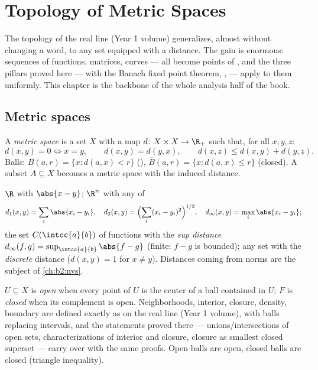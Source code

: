 \chapter{Topology of Metric Spaces}\label{ch:b2:metric}

The topology of the real line (Year 1 volume) generalizes, almost
without changing a word, to any set equipped with a distance. The
gain is enormous: sequences of functions, matrices, curves --- all
become points of , and the three pillars proved here
---  with the Banach fixed point theorem, ,
 --- apply to them uniformly. This chapter is the
backbone of the whole analysis half of the book.

\section{Metric spaces}

\begin{definition}\label{def:b2:metric:def}
A \emph{metric space} is a set $X$ with a map $d
\colon X \times X \to \R_+$ such that, for all $x, y, z$:
\[
d(x,y) = 0 \iff x = y,
\qquad
d(x,y) = d(y,x),
\qquad
d(x,z) \leq d(x,y) + d(y,z).
\]
Balls: $B(a, r) = \{x : d(a,x) < r\}$ (), $\overline B(a,r) =
\{x : d(a,x) \leq r\}$ (closed). A subset $A \subseteq X$ becomes a
metric space with the induced distance.
\end{definition}

\begin{example}\label{ex:b2:metric:examples}
$\R$ with $\abs{x - y}$; $\R^n$ with any of
\[
d_1(x,y) = \sum_i \abs{x_i - y_i},
\quad
d_2(x,y) = \Bigl(\sum_i (x_i - y_i)^2\Bigr)^{1/2},
\quad
d_\infty(x,y) = \max_i \abs{x_i - y_i};
\]
the set $C(\intcc{a}{b})$ of  functions with the
\emph{sup distance} $d_\infty(f, g) = \sup_{\intcc{a}{b}} \abs{f -
g}$ (finite: $f - g$ is bounded); any set with the \emph{discrete}
distance ($d(x,y) = 1$ for $x \neq y$). Distances coming from norms
are the subject of \cref{ch:b2:nvs}.
\end{example}

\begin{definition}\label{def:b2:metric:topology}
$U \subseteq X$ is \emph{open}
when every point of $U$ is the center of a ball contained in $U$;
$F$ is \emph{closed} when its complement is open. Neighborhoods,
interior, closure, density, boundary are defined exactly as on the
real line (Year 1 volume), with balls replacing intervals, and the
statements proved there --- unions/intersections of open sets,
characterizations of interior and closure, closure as smallest
closed superset --- carry over with the same proofs. Open balls are
open, closed balls are closed (triangle inequality).
\end{definition}

